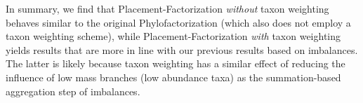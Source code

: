 In summary, we find that Placement-Factorization \emph{without} taxon weighting
behaves similar to the original Phylofactorization (which also does not employ a taxon weighting scheme),
while Placement-Factorization \emph{with} taxon weighting
yields results that are more in line with our previous results based on imbalances.
The latter is likely because taxon weighting has a similar effect of reducing the influence of low mass branches
(low abundance taxa) as the summation-based aggregation step of imbalances.






